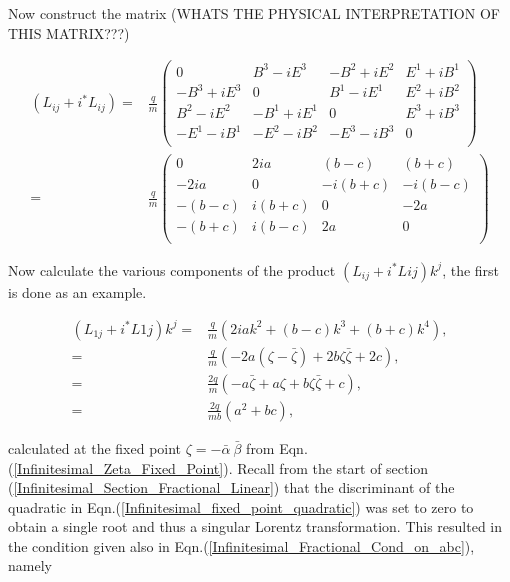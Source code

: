 \noindent Now construct the matrix (WHATS THE PHYSICAL INTERPRETATION OF THIS MATRIX???)

\begin{eqnarray*}
(L_{ij} + i ^*L_{ij}) = &
\frac{q}{m}
\left(
\begin{array}{cccc}
0           & B^3 - iE^3 & -B^2 + i E^2 & E^1 +iB^1 \\
-B^3+iE^3   & 0          & B^1 - i E^1  & E^2+iB^2 \\
B^2-iE^2    & -B^1 +iE^1 & 0            & E^3+iB^3 \\
-E^1 - iB^1 & -E^2-iB^2  & -E^3-iB^3    & 0        \\
\end{array}
\right) \\
= & 
\frac{q}{m}
\left(
\begin{array}{cccc}
0      & 2ia    & (b-c)   & (b+c)   \\
-2ia   & 0      & -i(b+c) & -i(b-c) \\
-(b-c) & i(b+c) & 0       & -2a     \\
-(b+c) & i(b-c) & 2a      & 0       \\
\end{array}
\right)
\end{eqnarray*}

\noindent Now calculate the various components of the product $(L_{ij} + i ^*L{ij}) k^j$, the first is done as an example. 

\begin{align*}
(L_{1j} + i ^*L{1j}) k^j = & \frac{q}{m} (2iak^2 + (b-c)k^3 + (b+c)k^4), \\
                         = &\frac{q}{m} (-2a(\zeta - \bar{\zeta}) + 2b\zeta\bar{\zeta} + 2c), \\
                         = &\frac{2q}{m} (-a\bar{\zeta} + a\zeta + b\zeta\bar{\zeta} +c), \\
                         = &\frac{2q}{mb} (a^2 + bc), 
\end{align*}

\noindent calculated at the fixed point $\zeta = - \bar{\alpha} \ {\bar{\beta}}$ from Eqn.(\ref{Infinitesimal_Zeta_Fixed_Point}). Recall from the start of section (\ref{Infinitesimal_Section_Fractional_Linear}) that the discriminant of the quadratic in Eqn.(\ref{Infinitesimal_fixed_point_quadratic}) was set to zero to obtain a single root and thus a singular Lorentz transformation. This resulted in the condition given also in Eqn.(\ref{Infinitesimal_Fractional_Cond_on_abc}), namely

